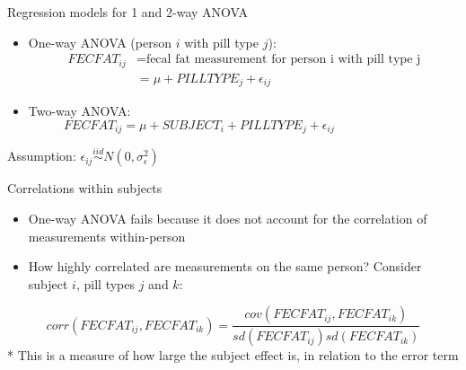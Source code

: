 \documentclass[
  ignorenonframetext,
]{beamer}
\providecommand{\tightlist}{%
  \setlength{\itemsep}{0pt}\setlength{\parskip}{0pt}}
\begin{document}
\begin{frame}{Regression models for 1 and 2-way ANOVA}
\protect\hypertarget{regression-models-for-1-and-2-way-anova-1}{}

\begin{itemize}
\item
  One-way ANOVA (person \(i\) with pill type \(j\)): \begin{equation*}
  \begin{aligned}
  FECFAT_{ij} &= \textrm{fecal fat measurement for person i with pill type j} \\
            &= \mu + PILLTYPE_j + \epsilon_{ij}
  \end{aligned}
  \end{equation*}
\item
  Two-way ANOVA: \begin{equation*}
  FECFAT_{ij} = \mu + SUBJECT_i + PILLTYPE_j + \epsilon_{ij}
  \phantom{\hspace{3cm}}
  \end{equation*}
\end{itemize}

Assumption:
\(\epsilon_{ij} \stackrel{iid}{\sim} N(0, \sigma_\epsilon^2)\)

\end{frame}

\begin{frame}{Correlations within subjects}
\protect\hypertarget{correlations-within-subjects}{}

\begin{itemize}
\tightlist
\item
  One-way ANOVA fails because it does not account for the correlation of
  measurements within-person
\item
  How highly correlated are measurements on the same person? Consider
  subject \(i\), pill types \(j\) and \(k\):
\end{itemize}

\begin{equation*}
corr(FECFAT_{ij}, FECFAT_{ik}) = 
          \frac{cov(FECFAT_{ij}, FECFAT_{ik})}
               {sd(FECFAT_{ij}) sd(FECFAT_{ik})}
\end{equation*} * This is a measure of how large the subject effect is,
in relation to the error term

\end{frame}
\end{document}
